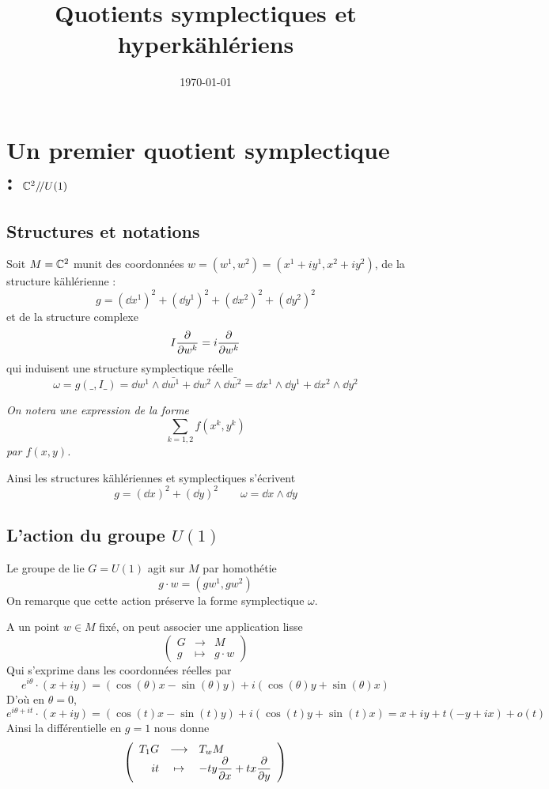 \documentclass[a4paper,draft]{amsart}
\title[Quotients symplectiques et hyperkählériens]{Quotients symplectiques et hyperkählériens}
\date\today
\begin{document}
\section{Un premier quotient symplectique : $\mathbb{C}^2/\!/U(1)$}
\subsection{Structures et notations}
Soit $M = \mathbb{C}^2$ munit des coordonnées $w = (w^1,w^2) = (x^1 + i y^1,x^2 + i y^2)$, de la structure kählérienne : 
\[
g = (\dd x^1)^2 + (\dd y^1)^2 + (\dd x^2)^2 + (\dd y^2)^2
\]
et de la structure complexe
\[
I \dfrac{\partial{}}{\partial{w^k}} = i \dfrac{\partial{}}{\partial{w^k}}
\]
qui induisent une structure symplectique réelle
\[
\omega = g(\_,I\_) = \dd w^1 \wedge \dd \bar{w^1} + \dd w^2 \wedge \dd \bar{w^2} = \dd x^1 \wedge \dd y^1 + \dd x^2 \wedge \dd y^2
\]


\bigskip
\begin{center}
\textit{On notera une expression de la forme 
\[
\sum_{k=1,2} f(x^k,y^k)
\]
par $f(x,y)$.}
\end{center}
\bigskip

Ainsi les structures kählériennes et symplectiques s'écrivent
\[
g = (\dd x)^2 + (\dd y)^2 \qquad \omega = \dd x \wedge \dd y
\]

\subsection{L'action du groupe $U(1)$}
Le groupe de lie $G = U(1)$ agit sur $M$ par homothétie
\[
g \cdot w = (gw^1,gw^2)
\]
On remarque que cette action préserve la forme symplectique $\omega$.

A un point $w \in  M$ fixé, on peut associer une application lisse
\[
\left(
\begin{array}{rcl}
G & \longrightarrow & M \\
g & \mapsto & g\cdot w
\end{array}
\right)
\]
Qui s'exprime dans les coordonnées réelles par
\[
e^{i\theta}\cdot (x+ i y) = (\cos(\theta)x -\sin(\theta)y) + i (\cos(\theta)y + \sin(\theta)x)
\]
D'où en $\theta = 0$,
\[
e^{i\theta + it}\cdot (x+ i y) = (\cos(t)x-\sin(t)y) + i (\cos(t)y +\sin(t)x) = x + i y + t(-y+ix) + o(t)
\]
Ainsi la différentielle en $g = 1$ nous donne
\[
\left(
\begin{array}{rcl}
T_1 G & \longrightarrow & T_w M \\
it & \mapsto & -ty\dfrac{\partial{}}{\partial{x}} + tx\dfrac{\partial{}}{\partial{y}}
\end{array}
\right)
\]
\end{document}
